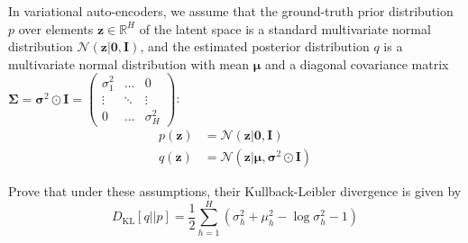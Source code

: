 \documentclass{article}
\begin{document}
In variational auto-encoders, we assume that the ground-truth prior distribution $p$ over elements $\mathbf{z} \in \mathbb{R}^H$ of the latent space is a standard multivariate normal distribution $\mathcal{N}(\mathbf{z}|\boldsymbol{0}, \mathbf{I})$, and the estimated posterior distribution $q$ is a multivariate normal distribution with mean $\boldsymbol{\mu}$ and a diagonal covariance matrix $\boldsymbol{\Sigma} = \boldsymbol{\sigma}^2 \odot \mathbf{I} =
\begin{pmatrix}
    \sigma_1^2 & \dots & 0 \\
    \vdots & \ddots & \vdots \\
    0 & \dots & \sigma_H^2
\end{pmatrix}$:
\begin{align}
p(\mathbf{z}) &= \mathcal{N}(\mathbf{z}|\boldsymbol{0}, \mathbf{I}) \\
q(\mathbf{z}) &= \mathcal{N}(\mathbf{z}|\boldsymbol{\mu}, \boldsymbol{\sigma}^2 \odot \mathbf{I})
\end{align}

Prove that under these assumptions, their Kullback-Leibler divergence is given by
\begin{equation}
D_{\text{KL}}[q||p] = \frac{1}{2} \sum_{h=1}^H (\sigma^2_h + \mu_h^2 - \log \sigma_h^2 - 1)
\end{equation}
\end{document}
